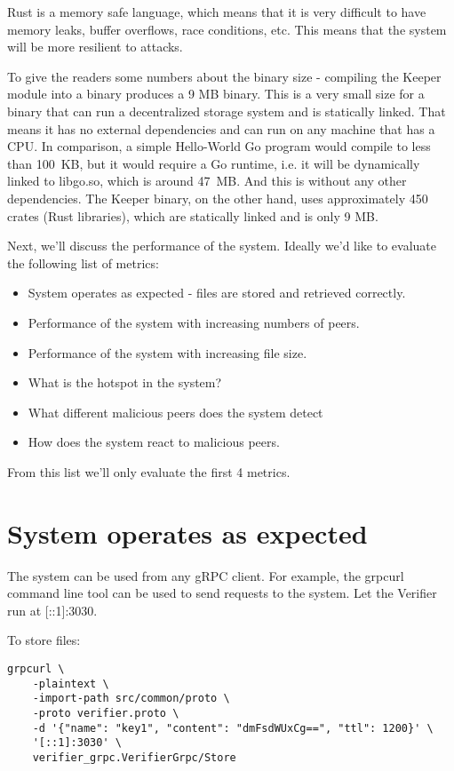 \documentclass[ twoside,openright,titlepage,numbers=noenddot,headinclude,%
                footinclude=true,cleardoublepage=empty,abstractoff, %
                BCOR=5mm,paper=a4,fontsize=11pt,%
                ngerman,american,%
                ]{scrreprt}
\begin{document}
Rust is a memory safe language, which means that it is very difficult to have memory leaks,
buffer overflows, race conditions, etc.
This means that the system will be more resilient to attacks.

To give the readers some numbers about the binary size - compiling
the Keeper module into a binary produces a 9 MB binary.
This is a very small size for a binary that can run a decentralized storage system and is statically linked.
That means it has no external dependencies and can run on any machine that has a CPU.
In comparison, a simple Hello-World Go program would compile to less than 100 KB,
but it would require a Go runtime, i.e. it will be dynamically linked to libgo.so, which is around 47 MB.
And this is without any other dependencies.
The Keeper binary, on the other hand, uses approximately 450 crates (Rust libraries),
which are statically linked and is only 9 MB.

Next, we'll discuss the performance of the system.
Ideally we'd like to evaluate the following list of metrics:
\begin{itemize}
    \item System operates as expected - files are stored and retrieved correctly.
    \item Performance of the system with increasing numbers of peers.
    \item Performance of the system with increasing file size.
    \item What is the hotspot in the system?
    \item What different malicious peers does the system detect
    \item How does the system react to malicious peers.
\end{itemize}

From this list we'll only evaluate the first 4 metrics.

\section{System operates as expected}
The system can be used from any gRPC client.
For example, the grpcurl command line tool can be used to send requests to the system.
Let the Verifier run at [::1]:3030.

To store files:
\begin{verbatim}
grpcurl \
    -plaintext \
    -import-path src/common/proto \
    -proto verifier.proto \
    -d '{"name": "key1", "content": "dmFsdWUxCg==", "ttl": 1200}' \
    '[::1]:3030' \
    verifier_grpc.VerifierGrpc/Store                                   
\end{verbatim}
\end{document}
